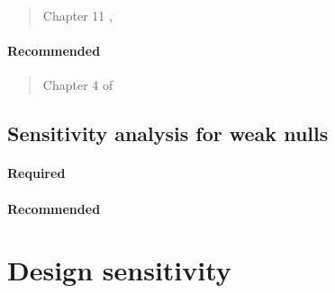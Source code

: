 \documentclass[12pt]{article}
\begin{document}
\begin{verse}
  Chapter 11 , 
\end{verse}

\paragraph*{Recommended}

\begin{verse} Chapter 4 of  \end{verse}

\begin{verse}  \end{verse}

\begin{verse}  \end{verse}

\begin{verse}  \end{verse}

\begin{verse}  \end{verse}

\subsection{Sensitivity analysis for weak nulls}

\paragraph*{Required}

\begin{verse}  \end{verse}

\paragraph*{Recommended}

\begin{verse}  \end{verse}

\begin{verse}  \end{verse}

\section{Design sensitivity}
\end{document}

